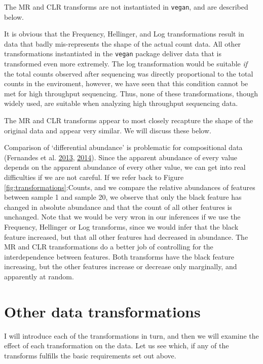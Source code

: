\documentclass[onecolumn]{book}
\theoremstyle{definition}
\theoremstyle{definition}
\theoremstyle{definition}
\theoremstyle{remark}
\begin{document}
The MR and CLR transforms are not instantiated in \texttt{vegan}, and
are described below.

It is obvious that the Frequency, Hellinger, and Log transformations
result in data that badly mis-represents the shape of the actual count
data. All other transformations instantiated in the \texttt{vegan}
package deliver data that is transformed even more extremely. The log
transformation would be suitable \emph{if} the total counts observed
after sequencing was directly proportional to the total counts in the
enviroment, however, we have seen that this condition cannot be met for
high throughput sequencing. Thus, none of these transformations, though
widely used, are suitable when analyzing high throughput sequencing
data.

The MR and CLR transforms appear to most closely recapture the shape of
the original data and appear very similar. We will discuss these below.

Comparison of `differential abundance' is problematic for compositional
data (Fernandes et al. \protect\hyperlink{ref-fernandes:2013}{2013},
\protect\hyperlink{ref-fernandes:2014}{2014}). Since the apparent
abundance of every value depends on the apparent abundance of every
other value, we can get into real difficulties if we are not careful. If
we refer back to Figure \ref{fig:transformations}:Counts, and we compare
the relative abundances of features between sample 1 and sample 20, we
observe that only the black feature has changed in absolute abundance
and that the count of all other features is unchanged. Note that we
would be very wron in our inferences if we use the Frequency, Hellinger
or Log transforms, since we would infer that the black feature
increased, but that all other features had decreased in abundance. The
MR and CLR transformations do a better job of controlling for the
interdependence between features. Both transforms have the black feature
increasing, but the other features increase or decrease only marginally,
and apparently at random.

\hypertarget{other-data-transformations}{%
\section{Other data transformations}\label{other-data-transformations}}

I will introduce each of the transformations in turn, and then we will
examine the effect of each transformation on the data. Let us see which,
if any of the transforms fulfills the basic requirements set out above.
\end{document}
